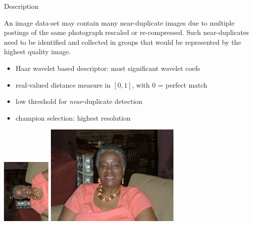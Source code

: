 
\begin{xpsectionbox}{Description}{}

An image data-set may contain many near-duplicate images due to multiple postings of the same photograph rescaled or re-compressed. Such near-duplicates need to be identified and collected in groups that would be represented by the highest quality image.

\begin{minipage}{0.6\linewidth}

\begin{itemize}
	\item Haar wavelet based descriptor: most significant wavelet coefs
	\item real-valued distance measure in $[0,1]$, with 0 = perfect match
	\item low threshold for \emph{near}-duplicate detection
	\item champion selection: highest resolution
\end{itemize}
\end{minipage}
\begin{minipage}{0.5\linewidth}

\begin{center}
			\includegraphics[height=0.25\linewidth]{images/NearDupScaleRot}
			\includegraphics[height=0.25\linewidth]{images/NearDupScale}
\end{center}

\end{minipage}
\end{xpsectionbox}

